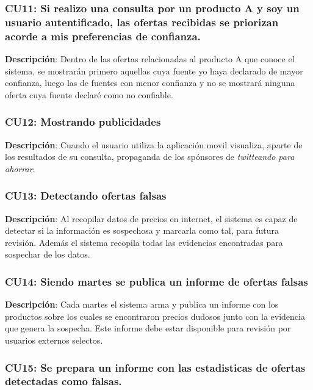 \subsubsection{CU11: Si realizo una consulta por un producto A y soy un
usuario autentificado, las ofertas recibidas se priorizan acorde a mis
preferencias de confianza.}

\textbf{Descripción}: Dentro de las ofertas relacionadas al producto A
que conoce el sistema, se mostrarán primero aquellas cuya fuente yo haya
declarado de mayor confianza, luego las de fuentes con menor confianza y
no se mostrará ninguna oferta cuya fuente declaré como no confiable.

\subsubsection{CU12: Mostrando publicidades}

\textbf{Descripción}: Cuando el usuario utiliza la aplicación movil
visualiza, aparte de los resultados de su consulta, propaganda de los
spónsores de \emph{twitteando para ahorrar}.

\subsubsection{CU13: Detectando ofertas falsas}

\textbf{Descripción}: Al recopilar datos de precios en internet, el
sistema es capaz de detectar si la información es sospechosa y marcarla
como tal, para futura revisión. Además el sistema recopila todas las
evidencias encontradas para sospechar de los datos.

\subsubsection{CU14: Siendo martes se publica un informe de ofertas
falsas}

\textbf{Descripción}: Cada martes el sistema arma y publica un informe
con los productos sobre los cuales se encontraron precios dudosos junto
con la evidencia que genera la sospecha. Este informe debe estar
disponible para revisión por usuarios externos selectos.

\subsubsection{CU15: Se prepara un informe con las estadisticas de
ofertas detectadas como falsas.}

